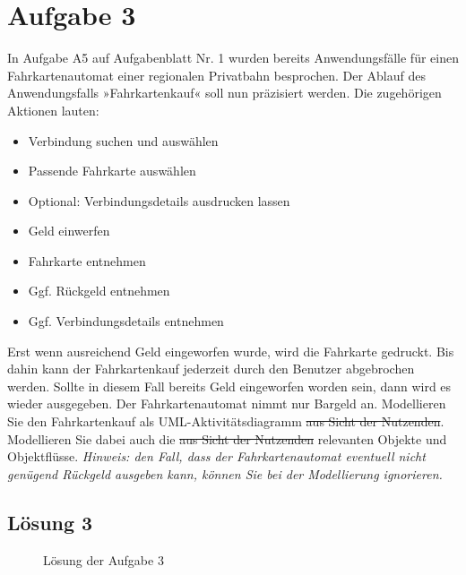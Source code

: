 \documentclass[main.tex]{subfiles}
\begin{document}
\section{Aufgabe 3}
In Aufgabe A5 auf Aufgabenblatt Nr. 1 wurden bereits Anwendungsfälle für einen Fahrkartenautomat einer regionalen Privatbahn besprochen. Der Ablauf des Anwendungsfalls »Fahrkartenkauf« soll nun präzisiert werden. Die zugehörigen Aktionen lauten:

\begin{itemize}
\item Verbindung suchen und auswählen
\item Passende Fahrkarte auswählen
\item Optional: Verbindungsdetails ausdrucken lassen
\item Geld einwerfen
\item Fahrkarte entnehmen
\item Ggf. Rückgeld entnehmen
\item Ggf. Verbindungsdetails entnehmen
\end{itemize}

Erst wenn ausreichend Geld eingeworfen wurde, wird die Fahrkarte gedruckt. Bis dahin kann der Fahrkartenkauf jederzeit durch den Benutzer abgebrochen werden. Sollte in diesem Fall bereits Geld eingeworfen worden sein, dann wird es wieder ausgegeben. Der Fahrkartenautomat nimmt nur Bargeld an.
Modellieren Sie den Fahrkartenkauf als UML-Aktivitätsdiagramm \sout{aus Sicht der Nutzenden}. Modellieren Sie dabei auch die \sout{aus Sicht der Nutzenden} relevanten Objekte und Objektflüsse.
\textit{Hinweis: den Fall, dass der Fahrkartenautomat eventuell nicht genügend Rückgeld ausgeben kann, können Sie bei der Modellierung ignorieren.}

\pagebreak
\subsection{Lösung 3}
\begin{figure}[h]
    \caption{Lösung der Aufgabe 3}
    \label{fig:lgs3}
\end{figure}
\end{document}

